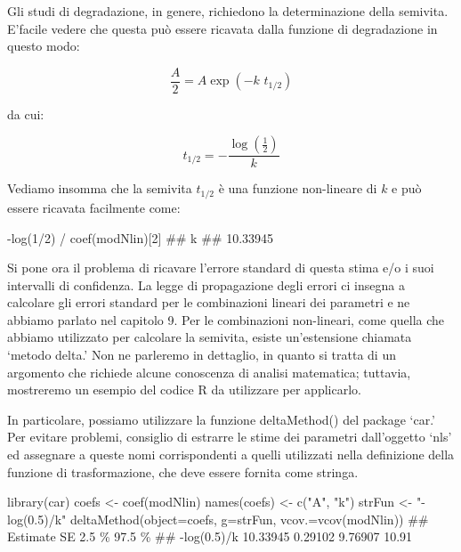 \documentclass[a4paper,12pt,oneside]{book}
\newenvironment{Shaded}{\begin{snugshade}}{\end{snugshade}}
\newcommand{\DecValTok}[1]{#1}
\newcommand{\SpecialCharTok}[1]{#1}
\newcommand{\StringTok}[1]{#1}
\newcommand{\DocumentationTok}[1]{#1}
\newcommand{\OtherTok}[1]{#1}
\newcommand{\FunctionTok}[1]{#1}
\newcommand{\AttributeTok}[1]{#1}
\newcommand{\NormalTok}[1]{#1}
\begin{document}
Gli studi di degradazione, in genere, richiedono la determinazione della semivita. E'facile vedere che questa può essere ricavata dalla funzione di degradazione in questo modo:

\[\frac{A}{2} = A \exp ( - k \,\, t_{1/2})\]

da cui:

\[t_{1/2} = - \frac{ \log \left( {\frac{1}{2}} \right) }{k}\]

Vediamo insomma che la semivita \(t_{1/2}\) è una funzione non-lineare di \(k\) e può essere ricavata facilmente come:

\begin{Shaded}
\begin{Highlighting}[]
\SpecialCharTok{{-}}\FunctionTok{log}\NormalTok{(}\DecValTok{1}\SpecialCharTok{/}\DecValTok{2}\NormalTok{) }\SpecialCharTok{/} \FunctionTok{coef}\NormalTok{(modNlin)[}\DecValTok{2}\NormalTok{]}
\DocumentationTok{\#\#        k }
\DocumentationTok{\#\# 10.33945}
\end{Highlighting}
\end{Shaded}

Si pone ora il problema di ricavare l'errore standard di questa stima e/o i suoi intervalli di confidenza. La legge di propagazione degli errori ci insegna a calcolare gli errori standard per le combinazioni lineari dei parametri e ne abbiamo parlato nel capitolo 9. Per le combinazioni non-lineari, come quella che abbiamo utilizzato per calcolare la semivita, esiste un'estensione chiamata `metodo delta.' Non ne parleremo in dettaglio, in quanto si tratta di un argomento che richiede alcune conoscenza di analisi matematica; tuttavia, mostreremo un esempio del codice R da utilizzare per applicarlo.

In particolare, possiamo utilizzare la funzione deltaMethod() del package `car.' Per evitare problemi, consiglio di estrarre le stime dei parametri dall'oggetto `nls' ed assegnare a queste nomi corrispondenti a quelli utilizzati nella definizione della funzione di trasformazione, che deve essere fornita come stringa.

\begin{Shaded}
\begin{Highlighting}[]
\FunctionTok{library}\NormalTok{(car)}
\NormalTok{coefs }\OtherTok{\textless{}{-}} \FunctionTok{coef}\NormalTok{(modNlin) }
\FunctionTok{names}\NormalTok{(coefs) }\OtherTok{\textless{}{-}} \FunctionTok{c}\NormalTok{(}\StringTok{"A"}\NormalTok{, }\StringTok{"k"}\NormalTok{)}
\NormalTok{strFun }\OtherTok{\textless{}{-}} \StringTok{"{-}log(0.5)/k"}
\FunctionTok{deltaMethod}\NormalTok{(}\AttributeTok{object=}\NormalTok{coefs, }\AttributeTok{g=}\NormalTok{strFun, }\AttributeTok{vcov.=}\FunctionTok{vcov}\NormalTok{(modNlin))}
\DocumentationTok{\#\#             Estimate       SE    2.5 \% 97.5 \%}
\DocumentationTok{\#\# {-}log(0.5)/k 10.33945  0.29102  9.76907  10.91}
\end{Highlighting}
\end{Shaded}
\end{document}
